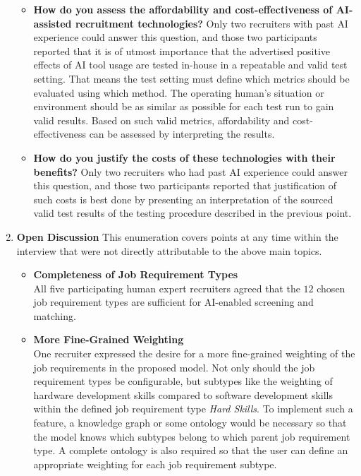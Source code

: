 \documentclass[draft,final]{thesisclass} %
\begin{document}
\begin{enumerate}
    \begin{itemize}
        \item \textbf{How do you assess the affordability and cost-effectiveness of \acs{AI}-assisted recruitment technologies?}
        Only two recruiters with past \acs{AI} experience could answer this question, and those two participants reported that it is of utmost importance that the advertised positive effects of \acs{AI} tool usage are tested in-house in a repeatable and valid test setting. That means the test setting must define which metrics should be evaluated using which method. The operating human's situation or environment should be as similar as possible for each test run to gain valid results. Based on such valid metrics, affordability and cost-effectiveness can be assessed by interpreting the results.
        \item \textbf{How do you justify the costs of these technologies with their benefits?}
        Only two recruiters who had past \acs{AI} experience could answer this question, and those two participants reported that justification of such costs is best done by presenting an interpretation of the sourced valid test results of the testing procedure described in the previous point.
    \end{itemize}
    \item \textbf{Open Discussion}
    This enumeration covers points at any time within the interview that were not directly attributable to the above main topics.
    \begin{itemize}
        \item \textbf{Completeness of Job Requirement Types}\\
        All five participating human expert recruiters agreed that the $12$ chosen job requirement types are sufficient for \acs{AI}-enabled screening and matching.
        \item \textbf{More Fine-Grained Weighting}\\
        One recruiter expressed the desire for a more fine-grained weighting of the job requirements in the proposed model.
        Not only should the job requirement types be configurable, but subtypes like the weighting of hardware development skills compared to software development skills within the defined job requirement type \textit{Hard Skills}.
        To implement such a feature, a knowledge graph or some ontology would be necessary so that the model knows which subtypes belong to which parent job requirement type. A complete ontology is also required so that the user can define an appropriate weighting for each job requirement subtype.

\end{itemize}
\end{enumerate}
\end{document}
